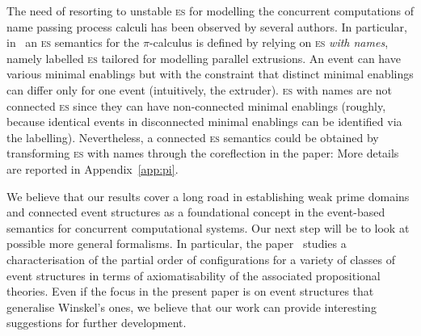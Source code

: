 \documentclass[conference]{IEEEtran}
\newcommand{\esabbr}{\textsc{es}}
\newcommand{\esnmabbr}{\textsc{esn}}
\begin{document}

The need of resorting to unstable {\esabbr} for modelling the
concurrent computations of name passing process calculi has been
observed by several authors. In particular, in~\cite{CVY:ESSPE} an
{\esabbr} semantics for the $\pi$-calculus is defined by relying on
 {\esabbr} \emph{with names}, %
namely labelled {\esabbr} tailored for modelling
parallel extrusions. An event can have various minimal enablings but
with the constraint that distinct minimal enablings can differ only for one
event (intuitively, the extruder).
%
{\esabbr} with names are not connected {\esabbr} since they can have 
non-connected minimal enablings (roughly, because identical events in 
disconnected minimal enablings can be identified via the labelling).
% 
Nevertheless, a connected {\esabbr} semantics could be obtained by
transforming {\esabbr} with names through the coreflection in the
paper: More details are reported 
in Appendix~\ref{app:pi}.


We believe that our results cover a long road in establishing weak prime domains and 
connected event structures as a foundational concept in the event-based semantics for 
concurrent computational systems.
%
Our next step will be to look at possible more general formalisms. 
In particular, the paper~\cite{GP:CSESPN} studies a characterisation 
of the partial order of configurations for a variety of classes of event
structures in terms of axiomatisability of the associated
propositional theories. Even if the focus in the present paper is 
on event structures that generalise Winskel's ones, we believe that
our work can provide interesting suggestions for
further development.
\end{document}
